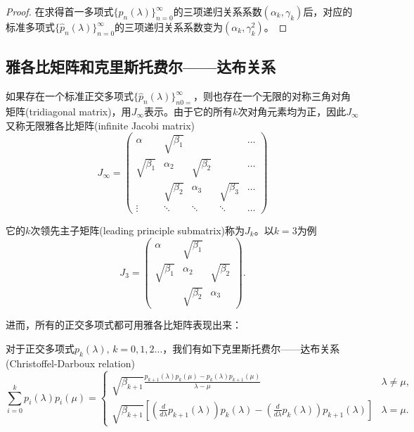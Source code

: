 \begin{subappendices}
\begin{proof}
  在求得首一多项式$\{ p_{n}(\lambda) \}_{n=0}^{\infty}$的三项递归关系系数$(\alpha_{k}, \gamma_k)$后，对应的标准多项式$\{ \hat{p}_{n}(\lambda) \}_{n=0}^{\infty}$的三项递归关系系数变为$(\alpha_{k}, \gamma_k^2)$。
\end{proof}

\subsection{雅各比矩阵和克里斯托费尔——达布关系}
如果存在一个标准正交多项式$\{ \hat{p}_{n} (\lambda) \}_{n0=}^{\infty}$，则也存在一个无限的对称三角对角矩阵(tridiagonal matrix)，用$J_{\infty}$表示。由于它的所有$k$次对角元素均为正，因此$J_{\infty}$又称无限雅各比矩阵(infinite Jacobi matrix)
\begin{equation}
  \label{eq:poly-jacobi-matrix-infty-def}
  J_{\infty}=
  \begin{pmatrix}
    \alpha & \sqrt{\beta_1} & & & \dots \\
    \sqrt{\beta_1} & \alpha_2 & \sqrt{\beta_2} & & \dots \\
    & \sqrt{\beta_2} & \alpha_3 & \sqrt{\beta_3} & \dots \\
    \vdots & \ddots & \ddots & \ddots & \dots
  \end{pmatrix}
\end{equation}

它的$k$次领先主子矩阵(leading principle submatrix)称为$J_k$。以$k=3$为例
\begin{equation*}
  J_3 = \begin{pmatrix}
  \alpha & \sqrt{\beta_1} & \\
  \sqrt{\beta_1} & \alpha_2 & \sqrt{\beta_2} \\
  & \sqrt{\beta_2} & \alpha_3
  \end{pmatrix}.
\end{equation*}

进而，所有的正交多项式都可用雅各比矩阵表现出来：
\begin{theorem}
  \label{theorem:poly-christoffel-darboux-relation-theorem}
  对于正交多项式$p_k(\lambda), \, k=0,1,2\ldots$，我们有如下克里斯托费尔——达布关系(Christoffel-Darboux relation)
  \begin{equation}
    \label{eq:poly-christoffel-darboux-relation-def}
      \sum_{i=0}^{k} p_{i}(\lambda) p_i(\mu) =
      \begin{cases}
        \sqrt{\beta_{k+1}} \frac{
        p_{k+1}(\lambda) p_{k}(\mu) - p_k (\lambda) p_{k+1}(\mu)
        }{
        \lambda - \mu} & \lambda \neq \mu, \\
        \sqrt{\beta_{k+1}} \left[
        \left(\frac{d}{d \lambda} p_{k+1}(\lambda)\right) p_k(\lambda)
        - \left(\frac{d}{d \lambda} p_{k} (\lambda) \right) p_{k+1}(\lambda)
        \right] & \lambda = \mu.
      \end{cases}
  \end{equation}


\end{theorem}
\end{subappendices}
